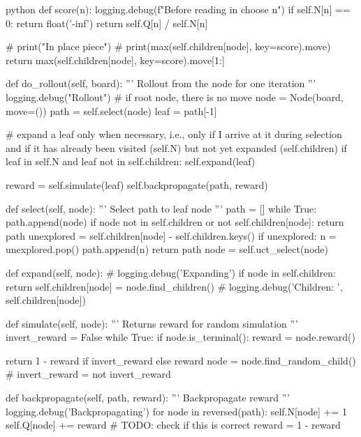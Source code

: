 \begin{mintedbox}{python}
        def score(n):
            logging.debug(f"Before reading in choose {n}")
            if self.N[n] == 0:
                return float('-inf')
            return self.Q[n] / self.N[n]

        # print("In place piece")
        # print(max(self.children[node], key=score).move)
        return max(self.children[node], key=score).move[1:]

    def do_rollout(self, board):
        '''
        Rollout from the node for one iteration
        '''
        logging.debug("Rollout")
        # if root node, there is no move
        node = Node(board, move=())
        path = self.select(node)
        leaf = path[-1]

        # expand a leaf only when necessary, i.e., only if I arrive at it during selection and if it has already been visited (self.N) but not yet expanded (self.children)
        if leaf in self.N and leaf not in self.children:
            self.expand(leaf)

        reward = self.simulate(leaf)
        self.backpropagate(path, reward)

    def select(self, node):
        '''
        Select path to leaf node
        '''
        path = []
        while True:
            path.append(node)
            if node not in self.children or not self.children[node]:
                return path
            unexplored = self.children[node] - self.children.keys()
            if unexplored:
                n = unexplored.pop()
                path.append(n)
                return path
            node = self.uct_select(node)

    def expand(self, node):
        # logging.debug('Expanding')
        if node in self.children:
            return
        self.children[node] = node.find_children()
        # logging.debug('Children: ', self.children[node])

    def simulate(self, node):
        '''
        Returns reward for random simulation
        '''
        invert_reward = False
        while True:
            if node.is_terminal():
                reward = node.reward()

                return 1 - reward if invert_reward else reward
            node = node.find_random_child()
            # invert_reward = not invert_reward

    def backpropagate(self, path, reward):
        '''
        Backpropagate reward
        '''
        logging.debug('Backpropagating')
        for node in reversed(path):
            self.N[node] += 1
            self.Q[node] += reward
            # TODO: check if this is correct
            reward = 1 - reward


\end{mintedbox}
